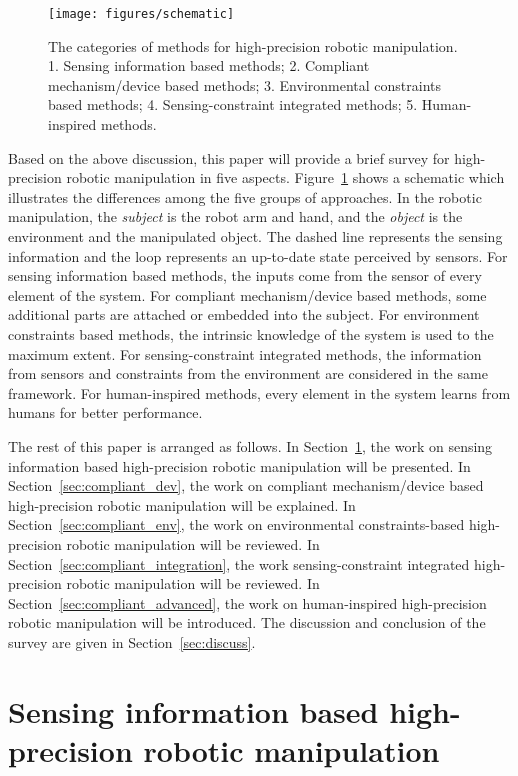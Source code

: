 \documentclass[journal,twoside,web]{ieeecolor}
\begin{document}
\begin{figure}
    \centering
    \texttt{[image: figures/schematic]}
    \caption{The categories of methods for high-precision robotic manipulation. 
    1. Sensing information based methods; 
    2. Compliant mechanism/device based methods;
    3. Environmental constraints based methods;
    4. Sensing-constraint integrated methods;
    5. Human-inspired methods.}
    \label{fig:schematic}
\end{figure}

Based on the above discussion, this paper will provide a brief survey for high-precision robotic manipulation in five aspects. 
Figure~\ref{fig:schematic} shows a schematic which illustrates the differences among the five groups of approaches. In the robotic manipulation, the \textit{subject} is the robot arm and hand, and the \textit{object} is the environment and the manipulated object. 
The dashed line represents the sensing information and the loop represents an up-to-date state perceived by sensors. 
For sensing information based methods, the inputs come from the sensor of every element of the system. 
For compliant mechanism/device based methods, some additional parts are attached or embedded into the subject.
For environment constraints based methods, the intrinsic knowledge of the system is used to the maximum extent. 
For sensing-constraint integrated methods, the information from sensors and constraints from the environment are considered in the same framework. 
For human-inspired methods, every element in the system learns from humans for better performance.

The rest of this paper is arranged as follows. 
In Section~\ref{sec:compliant_sensor}, the work on sensing information based high-precision robotic manipulation will be presented. 
In Section~\ref{sec:compliant_dev}, the work on compliant mechanism/device based high-precision robotic manipulation will be explained. 
In Section~\ref{sec:compliant_env}, the work on environmental constraints-based high-precision robotic manipulation will be reviewed. 
In Section~\ref{sec:compliant_integration}, the work sensing-constraint integrated high-precision robotic manipulation will be reviewed. 
In Section~\ref{sec:compliant_advanced}, the work on human-inspired high-precision robotic manipulation will be introduced. The discussion and conclusion of the survey are given in Section~\ref{sec:discuss}.

\section{Sensing information based high-precision robotic manipulation}
\label{sec:compliant_sensor}
\end{document}
